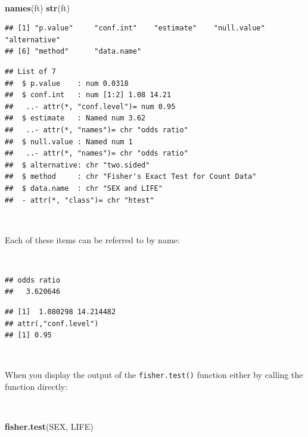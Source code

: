 \documentclass[12pt,a4paper]{book}
\newenvironment{Shaded}{\begin{snugshade}}{\end{snugshade}}
\newcommand{\KeywordTok}[1]{\textcolor[rgb]{0.13,0.29,0.53}{\textbf{#1}}}
\newcommand{\OperatorTok}[1]{\textcolor[rgb]{0.81,0.36,0.00}{\textbf{#1}}}
\newcommand{\NormalTok}[1]{#1}
\theoremstyle{definition}
\theoremstyle{definition}
\theoremstyle{definition}
\theoremstyle{remark}
\begin{document}
~

\begin{Shaded}
\begin{Highlighting}[]
\KeywordTok{names}\NormalTok{(ft)}
\KeywordTok{str}\NormalTok{(ft)}
\end{Highlighting}
\end{Shaded}

\begin{verbatim}
## [1] "p.value"     "conf.int"    "estimate"    "null.value"  "alternative"
## [6] "method"      "data.name"
\end{verbatim}

\begin{verbatim}
## List of 7
##  $ p.value    : num 0.0318
##  $ conf.int   : num [1:2] 1.08 14.21
##   ..- attr(*, "conf.level")= num 0.95
##  $ estimate   : Named num 3.62
##   ..- attr(*, "names")= chr "odds ratio"
##  $ null.value : Named num 1
##   ..- attr(*, "names")= chr "odds ratio"
##  $ alternative: chr "two.sided"
##  $ method     : chr "Fisher's Exact Test for Count Data"
##  $ data.name  : chr "SEX and LIFE"
##  - attr(*, "class")= chr "htest"
\end{verbatim}

~

Each of these items can be referred to by name:

~

\begin{Shaded}
\end{Shaded}

\begin{verbatim}
## odds ratio 
##   3.620646
\end{verbatim}

\begin{verbatim}
## [1]  1.080298 14.214482
## attr(,"conf.level")
## [1] 0.95
\end{verbatim}

~

When you display the output of the \texttt{fisher.test()} function
either by calling the function directly:

~

\begin{Shaded}
\begin{Highlighting}[]
\KeywordTok{fisher.test}\NormalTok{(SEX, LIFE)}
\end{Highlighting}
\end{Shaded}
\end{document}
